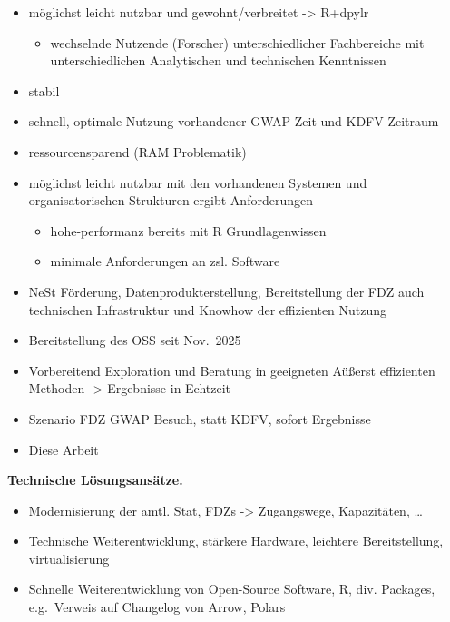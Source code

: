\documentclass[
  german,
  10pt,
  twoside]{article}
\providecommand{\tightlist}{%
  \setlength{\itemsep}{0pt}\setlength{\parskip}{0pt}}
\begin{document}
\begin{itemize}
\item
  möglichst leicht nutzbar und gewohnt/verbreitet -\textgreater{}
  R+dpylr

  \begin{itemize}
  \tightlist
  \item
    wechselnde Nutzende (Forscher) unterschiedlicher Fachbereiche mit
    unterschiedlichen Analytischen und technischen Kenntnissen
  \end{itemize}
\item
  stabil
\item
  schnell, optimale Nutzung vorhandener GWAP Zeit und KDFV Zeitraum
\item
  ressourcensparend (RAM Problematik)
\item
  möglichst leicht nutzbar mit den vorhandenen Systemen und
  organisatorischen Strukturen ergibt Anforderungen

  \begin{itemize}
  \tightlist
  \item
    hohe-performanz bereits mit R Grundlagenwissen
  \item
    minimale Anforderungen an zsl. Software
  \end{itemize}
\item
  NeSt Förderung, Datenprodukterstellung, Bereitstellung der FDZ auch
  technischen Infrastruktur und Knowhow der effizienten Nutzung
\item
  Bereitstellung des OSS seit Nov.~2025
\item
  Vorbereitend Exploration und Beratung in geeigneten Aüßerst
  effizienten Methoden -\textgreater{} Ergebnisse in Echtzeit
\item
  Szenario FDZ GWAP Besuch, statt KDFV, sofort Ergebnisse
\item
  Diese Arbeit
\end{itemize}

\textbf{Technische Lösungsansätze.}

\begin{itemize}
\tightlist
\item
  Modernisierung der amtl. Stat, FDZs -\textgreater{} Zugangswege,
  Kapazitäten, \ldots{}
\item
  Technische Weiterentwicklung, stärkere Hardware, leichtere
  Bereitstellung, virtualisierung
\item
  Schnelle Weiterentwicklung von Open-Source Software, R, div. Packages,
  e.g.~Verweis auf Changelog von Arrow, Polars
\end{itemize}
\end{document}
